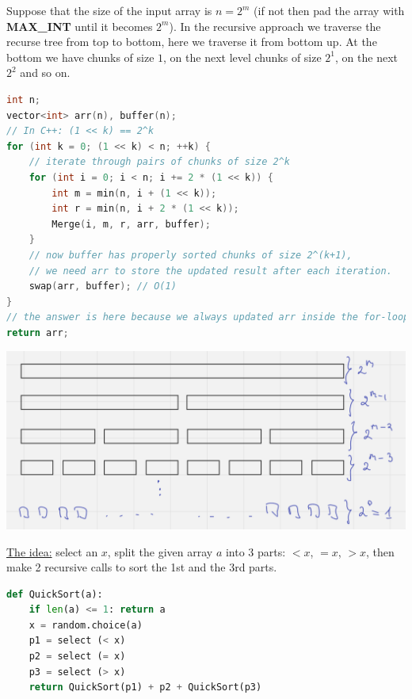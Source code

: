 
Suppose that the size of the input array is $n = 2^m$ (if not then pad the array with \textbf{MAX\_INT} until it becomes $2^m$). In the recursive approach we traverse the recurse tree from top to bottom, here we traverse it from bottom up. At the bottom we have chunks of size $1$, on the next level chunks of size $2^1$, on the next $2^2$ and so on.

\begin{lstlisting}[language=C++]
int n;
vector<int> arr(n), buffer(n);
// In C++: (1 << k) == 2^k
for (int k = 0; (1 << k) < n; ++k) {
    // iterate through pairs of chunks of size 2^k
    for (int i = 0; i < n; i += 2 * (1 << k)) {
        int m = min(n, i + (1 << k));
        int r = min(n, i + 2 * (1 << k));
        Merge(i, m, r, arr, buffer);
    }
    // now buffer has properly sorted chunks of size 2^(k+1),
    // we need arr to store the updated result after each iteration.
    swap(arr, buffer); // O(1)
}
// the answer is here because we always updated arr inside the for-loop
return arr;

\end{lstlisting}

\begin{center}
    \includegraphics[scale=0.6]{./assets/13-sorting-algorithms/1.PNG}
\end{center}


\underline{The idea:} select an $x$, split the given array $a$ into 3 parts: $<x$, $=x$, $>x$, then make 2 recursive calls to sort the 1st and the 3rd parts.

\begin{lstlisting}[language=Python]
def QuickSort(a):
    if len(a) <= 1: return a
    x = random.choice(a)
    p1 = select (< x)
    p2 = select (= x)
    p3 = select (> x)
    return QuickSort(p1) + p2 + QuickSort(p3)
\end{lstlisting}

